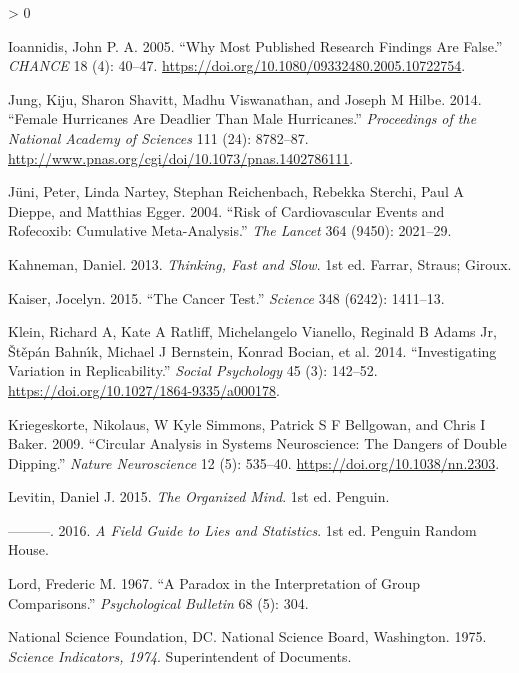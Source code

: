 \documentclass[
  10pt,
  b5paper]{book}
\newlength{\cslhangindent}
\newenvironment{CSLReferences}[2] %
 {%
  \setlength{\parindent}{0pt}
  \ifodd #1 \everypar{\setlength{\hangindent}{\cslhangindent}}\ignorespaces\fi
  \ifnum #2 > 0
  \setlength{\parskip}{#2\baselineskip}
  \fi
 }%
 {}
\begin{document}
\begin{CSLReferences}{1}{0}
\leavevmode\hypertarget{ref-r19_ioannidis_2005}{}%
Ioannidis, John P. A. 2005. {``Why Most Published Research Findings Are False.''} \emph{CHANCE} 18 (4): 40--47. \url{https://doi.org/10.1080/09332480.2005.10722754}.

\leavevmode\hypertarget{ref-jung2014female}{}%
Jung, Kiju, Sharon Shavitt, Madhu Viswanathan, and Joseph M Hilbe. 2014. {``Female Hurricanes Are Deadlier Than Male Hurricanes.''} \emph{Proceedings of the National Academy of Sciences} 111 (24): 8782--87. \url{http://www.pnas.org/cgi/doi/10.1073/pnas.1402786111}.

\leavevmode\hypertarget{ref-juni2004risk}{}%
Jüni, Peter, Linda Nartey, Stephan Reichenbach, Rebekka Sterchi, Paul A Dieppe, and Matthias Egger. 2004. {``Risk of Cardiovascular Events and Rofecoxib: Cumulative Meta-Analysis.''} \emph{The Lancet} 364 (9450): 2021--29.

\leavevmode\hypertarget{ref-kahneman_2013}{}%
Kahneman, Daniel. 2013. \emph{Thinking, Fast and Slow}. 1st ed. Farrar, Straus; Giroux.

\leavevmode\hypertarget{ref-r5_kaiser_2015}{}%
Kaiser, Jocelyn. 2015. {``The Cancer Test.''} \emph{Science} 348 (6242): 1411--13.

\leavevmode\hypertarget{ref-r7_klein_others_2014}{}%
Klein, Richard A, Kate A Ratliff, Michelangelo Vianello, Reginald B Adams Jr, Štěpán Bahnı́k, Michael J Bernstein, Konrad Bocian, et al. 2014. {``Investigating Variation in Replicability.''} \emph{Social Psychology} 45 (3): 142--52. \url{https://doi.org/10.1027/1864-9335/a000178}.

\leavevmode\hypertarget{ref-r8_kriegeskorte_simmons_bellgowan_baker_2009}{}%
Kriegeskorte, Nikolaus, W Kyle Simmons, Patrick S F Bellgowan, and Chris I Baker. 2009. {``Circular Analysis in Systems Neuroscience: The Dangers of Double Dipping.''} \emph{Nature Neuroscience} 12 (5): 535--40. \url{https://doi.org/10.1038/nn.2303}.

\leavevmode\hypertarget{ref-levitin_2015}{}%
Levitin, Daniel J. 2015. \emph{The Organized Mind}. 1st ed. Penguin.

\leavevmode\hypertarget{ref-levitin_2016}{}%
---------. 2016. \emph{A Field Guide to Lies and Statistics}. 1st ed. Penguin Random House.

\leavevmode\hypertarget{ref-lord1967paradox}{}%
Lord, Frederic M. 1967. {``A Paradox in the Interpretation of Group Comparisons.''} \emph{Psychological Bulletin} 68 (5): 304.

\leavevmode\hypertarget{ref-national1975science}{}%
National Science Foundation, DC. National Science Board, Washington. 1975. \emph{Science Indicators, 1974}. Superintendent of Documents.


\end{CSLReferences}
\end{document}
